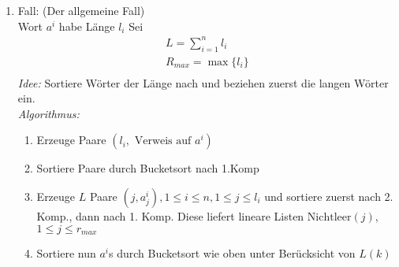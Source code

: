 \begin{enumerate}
            \item Fall: (Der allgemeine Fall) \\
            Wort $a^{i}$ habe Länge $l_{i}$ Sei
            \begin{align*}
                L = \sum \limits_{i=1}^{n} l_{i}\\
                R_{max} = \max \lbrace l_{i} \rbrace\\
            \end{align*}
            \emph{Idee:} Sortiere Wörter der Länge nach und beziehen zuerst die langen Wörter ein. \\
            \emph{Algorithmus:}             
            \begin{enumerate}
                \item Erzeuge Paare $\left( l_{i}, \text{ Verweis auf } a^{i} \right)$\\
                \item Sortiere Paare durch Bucketsort nach 1.Komp\\
                \item Erzeuge $L$ Paare $\left( j, a_{j}^{i} \right), 1 \leq i \leq n, 1 \leq j \leq l_{i}$ 
                    und sortiere zuerst nach 2. Komp., dann nach 1. Komp. Diese liefert lineare Listen $\text{Nichtleer}(j)$, $1 \leq j \leq r_{max}$\\
                \item Sortiere nun $a^{i}$s durch Bucketsort wie oben unter Berücksicht von $L(k)$
            \end{enumerate}
        \end{enumerate}

        
        

